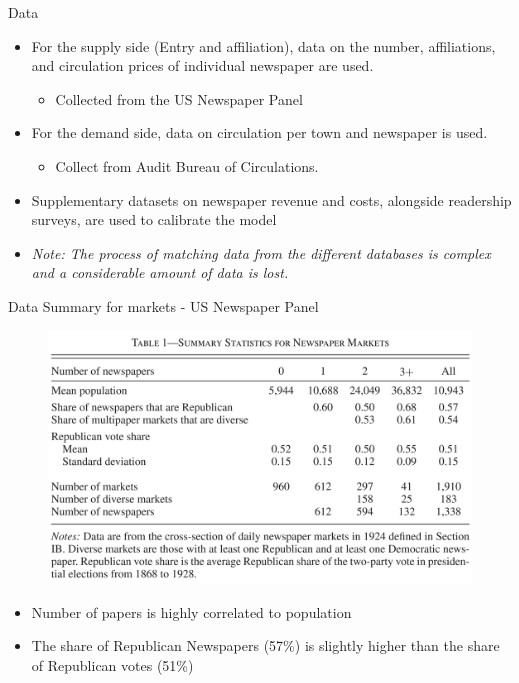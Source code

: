 \documentclass{beamer}
\begin{document}
\begin{frame}[t]{Data}
  \begin{itemize}
    \item For the supply side (Entry and affiliation), data on the number,
      affiliations, and circulation prices of individual newspaper are used.
      \begin{itemize}
        \item Collected from the US Newspaper Panel
      \end{itemize}
    \item For the demand side, data on circulation per town and newspaper
      is used.
      \begin{itemize}
        \item Collect from Audit Bureau of Circulations.
      \end{itemize}
    \item Supplementary datasets on newspaper revenue and costs, alongside
      readership surveys, are used to calibrate the model
    \item \textit{Note: The process of matching data from the different databases
      is complex and a considerable amount of data is lost.}
  \end{itemize}
\end{frame}

\begin{frame}[t]{Data Summary for markets - US Newspaper Panel}
  \begin{figure}
  \begin{center}
    \includegraphics[scale=0.14]{Table1.png}
  \end{center}
  \end{figure}

  \begin{itemize}
    \item Number of papers is highly correlated to population
    \item The share of Republican Newspapers (57\%) is slightly higher than
      the share of Republican votes (51\%)
  \end{itemize}
\end{frame}
\end{document}

